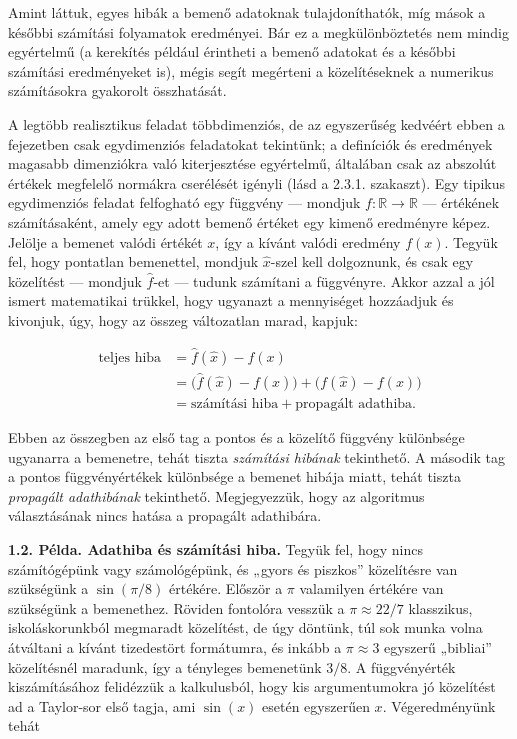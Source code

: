 \documentclass[
  magyar,
  11pt]{article}
\begin{document}
Amint láttuk, egyes hibák a bemenő adatoknak tulajdoníthatók, míg mások
a későbbi számítási folyamatok eredményei. Bár ez a megkülönböztetés nem
mindig egyértelmű (a kerekítés például érintheti a bemenő adatokat és a
későbbi számítási eredményeket is), mégis segít megérteni a
közelítéseknek a numerikus számításokra gyakorolt összhatását.

A legtöbb realisztikus feladat többdimenziós, de az egyszerűség kedvéért
ebben a fejezetben csak egydimenziós feladatokat tekintünk; a definíciók
és eredmények magasabb dimenziókra való kiterjesztése egyértelmű,
általában csak az abszolút értékek megfelelő normákra cserélését igényli
(lásd a 2.3.1. szakaszt). Egy tipikus egydimenziós feladat felfogható
egy függvény --- mondjuk \(f: \mathbb{R} \to \mathbb{R}\) --- értékének
számításaként, amely egy adott bemenő értéket egy kimenő eredményre
képez. Jelölje a bemenet valódi értékét \(x\), így a kívánt valódi
eredmény \(f(x)\). Tegyük fel, hogy pontatlan bemenettel, mondjuk
\(\hat{x}\)-szel kell dolgoznunk, és csak egy közelítést --- mondjuk
\(\hat{f}\)-et --- tudunk számítani a függvényre. Akkor azzal a jól
ismert matematikai trükkel, hogy ugyanazt a mennyiséget hozzáadjuk és
kivonjuk, úgy, hogy az összeg változatlan marad, kapjuk:

\[\begin{aligned}
\text{teljes hiba} &= \hat{f}(\hat{x}) - f(x) \\
&= \bigl(\hat{f}(\hat{x}) - f(\hat{x})\bigr) + \bigl(f(\hat{x}) - f(x)\bigr) \\
&= \text{számítási hiba} + \text{propagált adathiba}.
\end{aligned}\]

Ebben az összegben az első tag a pontos és a közelítő függvény
különbsége ugyanarra a bemenetre, tehát tiszta \emph{számítási hibának}
tekinthető. A második tag a pontos függvényértékek különbsége a bemenet
hibája miatt, tehát tiszta \emph{propagált adathibának} tekinthető.
Megjegyezzük, hogy az algoritmus választásának nincs hatása a propagált
adathibára.

\textbf{1.2. Példa. Adathiba és számítási hiba.} Tegyük fel, hogy nincs
számítógépünk vagy számológépünk, és „gyors és piszkos'' közelítésre van
szükségünk a \(\sin(\pi/8)\) értékére. Először a \(\pi\) valamilyen
értékére van szükségünk a bemenethez. Röviden fontolóra vesszük a
\(\pi \approx 22/7\) klasszikus, iskoláskorunkból megmaradt közelítést,
de úgy döntünk, túl sok munka volna átváltani a kívánt tizedestört
formátumra, és inkább a \(\pi \approx 3\) egyszerű „bibliai''
közelítésnél maradunk, így a tényleges bemenetünk \(3/8\). A
függvényérték kiszámításához felidézzük a kalkulusból, hogy kis
argumentumokra jó közelítést ad a Taylor-sor első tagja, ami \(\sin(x)\)
esetén egyszerűen \(x\). Végeredményünk tehát
\end{document}
